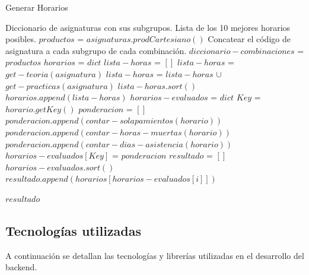 \newpage

\begin{algorithm}[H]
    \caption{Generar Horarios}
    \label{alg:generar_horarios}
    \begin{algorithmic}[1]
        \Require Diccionario de asignaturas con sus subgrupos.
        \Ensure Lista de los 10 mejores horarios posibles.
            \State $productos$ = $asignaturas.prodCartesiano()$
            \State Concatear el código de asignatura a cada subgrupo de cada combinación.
            \State $diccionario-combinaciones$ = $productos$
            \State $horarios$ = $dict$
                \State $lista-horas$ = $[]$
                    \State $lista-horas$ = $get-teoria(asignatura)$
                    \State $lista-horas$ = $lista-horas$ $\cup$ $get-practicas(asignatura)$
                \EndFor
                \State $lista-horas.sort()$ 
                \State $horarios.append(lista-horas)$ 
            \EndFor
            \State $horarios-evaluados$ = $dict$
                \State $Key$ = $horario.getKey()$    
                \State $ponderacion$ = $[]$
                \State $ponderacion.append(contar-solapamientos(horario))$
                \State $ponderacion.append(contar-horas-muertas(horario))$
                \State $ponderacion.append(contar-dias-asistencia(horario))$
                \State $horarios-evaluados[Key]$ = $ponderacion$
            \EndFor
            \State $resultado$ = $[]$ 
            \State $horarios-evaluados.sort()$ 
                \State $resultado.append(horarios[horarios-evaluados[i]])$
            \EndFor

            \Return $resultado$
        \EndFunction
    \end{algorithmic}
\end{algorithm}

\newpage

\subsection{Tecnologías utilizadas}

A continuación se detallan las tecnologías y librerías utilizadas en el desarrollo del backend.


